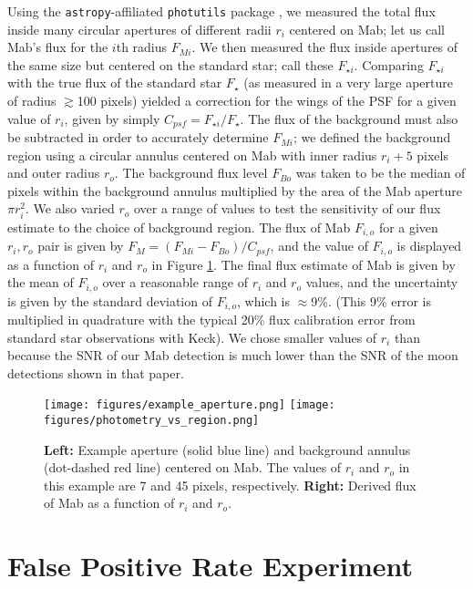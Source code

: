 \documentclass[preprint]{aastex631}
\begin{document}
Using the \texttt{astropy}-affiliated \texttt{photutils} package \cite{}, we measured the total flux inside many circular apertures of different radii $r_i$ centered on Mab; let us call Mab's flux for the $i$th radius $F_{M i}$. We then measured the flux inside apertures of the same size but centered on the standard star; call these $F_{\star i}$. Comparing $F_{\star i}$ with the true flux of the standard star $F_\star$ (as measured in a very large aperture of radius $\gtrsim$100 pixels) yielded a correction for the wings of the PSF for a given value of $r_{i}$, given by simply $C_{psf} = F_{\star i}/F_\star$. The flux of the background must also be subtracted in order to accurately determine $F_{M i}$; we defined the background region using a circular annulus centered on Mab with inner radius $r_i + 5$ pixels and outer radius $r_o$. The background flux level $F_{B o}$ was taken to be the median of pixels within the background annulus multiplied by the area of the Mab aperture $\pi r_i^2$. We also varied $r_o$ over a range of values to test the sensitivity of our flux estimate to the choice of background region. The flux of Mab $F_{i,o}$ for a given $r_i, r_o$ pair is given by $F_M = (F_{M i} - F_{B o}) / C_{psf}$, and the value of $F_{i,o}$ is displayed as a function of $r_i$ and $r_o$ in Figure \ref{fig:wing}. The final flux estimate of Mab is given by the mean of $F_{i,o}$ over a reasonable range of $r_i$ and $r_o$ values, and the uncertainty is given by the standard deviation of $F_{i,o}$, which is $\approx$9\%. (This 9\% error is multiplied in quadrature with the typical 20\% flux calibration error from standard star observations with Keck). We chose smaller values of $r_i$ than \citet{paradis23} because the SNR of our Mab detection is much lower than the SNR of the moon detections shown in that paper.

\begin{figure}
\texttt{[image: figures/example\_aperture.png]}
\texttt{[image: figures/photometry\_vs\_region.png]}
\caption{\textbf{Left:} Example aperture (solid blue line) and background annulus (dot-dashed red line) centered on Mab. The values of $r_i$ and $r_o$ in this example are 7 and 45 pixels, respectively. \textbf{Right:} Derived flux of Mab as a function of $r_i$ and $r_o$.\label{fig:wing}}
\end{figure}


\section{False Positive Rate Experiment}
\label{s:falsepositives}
\end{document}
